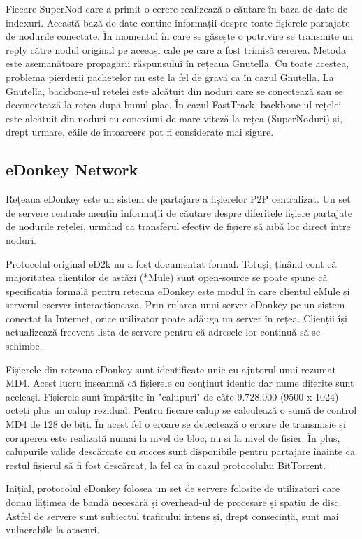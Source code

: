 Fiecare SuperNod care a primit o cerere realizează o căutare în baza de date
de indexuri. Această bază de date conține informații despre toate fișierele
partajate de nodurile conectate. În momentul în care se găsește o potrivire se
transmite un reply către nodul original pe aceeași cale pe care a fost trimisă
cererea. Metoda este asemănătoare propagării răspunsului în rețeaua Gnutella.
Cu toate acestea, problema pierderii pachetelor nu este la fel de gravă ca în
cazul Gnutella. La Gnutella, backbone-ul rețelei este alcătuit din noduri care
se conectează sau se deconectează la rețea după bunul plac. În cazul
FastTrack, backbone-ul rețelei este alcătuit din noduri cu conexiuni de mare
viteză la rețea (SuperNoduri) și, drept urmare, căile de întoarcere pot fi
considerate mai sigure.

\subsection{eDonkey Network}

Rețeaua eDonkey este un sistem de partajare a fișierelor P2P centralizat. Un
set de servere centrale mențin informații de căutare despre diferitele fișiere
partajate de nodurile rețelei, urmând ca transferul efectiv de fișiere să aibă
loc direct între noduri.

Protocolul original eD2k nu a fost documentat formal. Totuși, ținând cont că
majoritatea clienților de astăzi (*Mule) sunt open-source se poate spune că
specificația formală pentru rețeaua eDonkey este modul în care clientul eMule
și serverul eserver interacționează. Prin rularea unui server eDonkey pe un
sistem conectat la Internet, orice utilizator poate adăuga un server în rețea.
Clienții își actualizează frecvent lista de servere pentru că adresele lor
continuă să se schimbe.

Fișierele din rețeaua eDonkey sunt identificate unic cu ajutorul unui rezumat
MD4. Acest lucru înseamnă că fișierele cu conținut identic dar nume diferite
sunt aceleași. Fișierele sunt împărțite în "calupuri" de câte 9.728.000 (9500
x 1024) octeți plus un calup rezidual. Pentru fiecare calup se calculează o
sumă de control MD4 de 128 de biți. În acest fel o eroare se detectează o
eroare de transmisie și coruperea este realizată numai la nivel de bloc, nu și
la nivel de fișier. În plus, calupurile valide descărcate cu succes sunt
disponibile pentru partajare înainte ca restul fișierul să fi fost descărcat,
la fel ca în cazul protocolului BitTorrent.

Inițial, protocolul eDonkey folosea un set de servere folosite de utilizatori
care donau lățimea de bandă necesară și overhead-ul de procesare și spațiu de
disc. Astfel de servere sunt subiectul traficului intens și, drept consecință,
sunt mai vulnerabile la atacuri.

